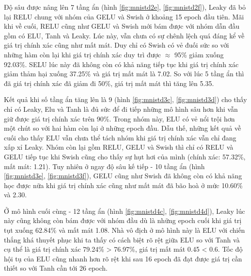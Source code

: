 Độ sâu được nâng lên 7 tầng ẩn (hình \ref{fig:mnistd2e}, \ref{fig:mnistd2f}), Leaky đã bỏ lại RELU chung với nhóm của GELU và Swish ở khoảng 15 epoch đầu tiên.
Mãi khi về cuối, RELU cũng như GELU và Swish mới bám được với nhóm dẫn đầu gồm có ELU, Tanh và Leaky.
Lúc này, vẫn chưa có sự chênh lệch quá đáng kể về giá trị chính xác cũng như mất mát.
Duy chỉ có Swish có vẻ đuối sức so với những hàm còn lại khi giá trị chính xác duy trì được $\approx$ 95\% giảm xuống 92.03\%.
SELU lúc này đã không còn có khả năng tiếp tục khi giá trị chính xác giảm thảm hại xuống 37.25\% và giá trị mất mát là 7.02.
So với lúc 5 tầng ẩn thì đã giá trị chính xác đã giảm đi 50\%, giá trị mất mát thì tăng lên 5.35.
\vspace{5pt}

Kết quả khi số tầng ẩn tăng lên là 9 (hình \ref{fig:mnistd3c}, \ref{fig:mnistd3d}) cho thấy chỉ có Leaky, Elu và Tanh là đủ sức để đi tiếp những mô hình sâu hơn khi vẫn giữ được giá trị chính xác trên 90\%.
Trong nhóm này, ELU có vẻ nổi trội hơn một chút so với hai hàm còn lại ở những epoch đầu.
Dẫu thế, những kết quả về cuối cho thấy ELU vẫn chưa thể tách nhóm khi giá trị chính xác vẫn chỉ đang xấp xỉ Leaky.
Nhóm còn lại gồm RELU, GELU và Swish thì chỉ có RELU và GELU tiếp tục khi Swish cũng cho thấy sự hụt hơi của mình (chính xác: 57.32\%, mất mát: 1.21).
Tuy nhiên ở ngay độ sâu kế tiếp - 10 tầng ẩn (hình \ref{fig:mnistd3e}, \ref{fig:mnistd3f}), GELU cũng như Swish đã không còn có khả năng học được nữa khi giá trị chính xác cũng như mất mát đã bão hoà ở mức 10.60\% và 2.30.
\vspace{5pt}

Ở mô hình cuối cùng - 12 tầng ẩn (hình \ref{fig:mnistd4c}, \ref{fig:mnistd4d}), Leaky lúc này cũng không còn bám được với nhóm đầu dù là những epoch cuối khi giá trị tụt xuống 62.84\% và mất mát 1.08.
Nhà vô địch ở mô hình này là ELU với chiến thắng khá thuyết phục khi ta thấy có cách biệt rõ rệt giữa ELU so với Tanh và cụ thể là giá trị chính xác 79.24\% > 76.97\%, giá trị mất mát 0.45 < 0.6.
Tốc độ hội tụ của ELU cũng nhanh hơn rõ rệt khi sau 16 epoch đã đạt được giá trị cần thiết so với Tanh cần tới 26 epoch.

